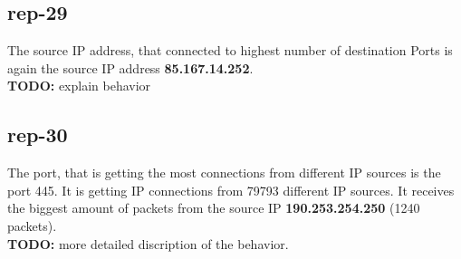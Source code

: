 \subsection*{rep-29}
The source IP address, that connected to highest number of destination Ports is again the source IP address \textbf{85.167.14.252}. \\

\textbf{TODO:} explain behavior

\subsection*{rep-30}
The port, that is getting the most connections from different IP sources is the port 445. It is getting IP connections from 79793 different IP sources. It receives the biggest amount of packets from the source IP \textbf{190.253.254.250} (1240 packets). \\

\textbf{TODO: } more detailed discription of the behavior.